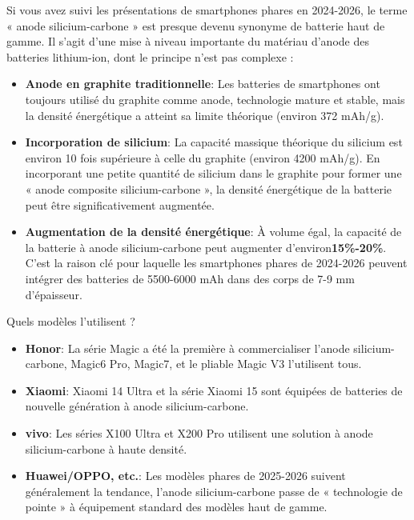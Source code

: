 
Si vous avez suivi les présentations de smartphones phares en 2024-2026, le terme « anode silicium-carbone » est presque devenu synonyme de batterie haut de gamme. Il s'agit d'une mise à niveau importante du matériau d'anode des batteries lithium-ion, dont le principe n'est pas complexe :

\begin{itemize}
  \item \textbf{Anode en graphite traditionnelle}: Les batteries de smartphones ont toujours utilisé du graphite comme anode, technologie mature et stable, mais la densité énergétique a atteint sa limite théorique (environ 372 mAh/g).
  \item \textbf{Incorporation de silicium}: La capacité massique théorique du silicium est environ 10 fois supérieure à celle du graphite (environ 4200 mAh/g). En incorporant une petite quantité de silicium dans le graphite pour former une « anode composite silicium-carbone », la densité énergétique de la batterie peut être significativement augmentée.
  \item \textbf{Augmentation de la densité énergétique}: À volume égal, la capacité de la batterie à anode silicium-carbone peut augmenter d'environ\textbf{15\%-20\%}. C'est la raison clé pour laquelle les smartphones phares de 2024-2026 peuvent intégrer des batteries de 5500-6000 mAh dans des corps de 7-9 mm d'épaisseur.
\end{itemize}

\begin{tcbinfo}{Quels modèles l'utilisent ?}
\begin{itemize}
  \item \textbf{Honor}: La série Magic a été la première à commercialiser l'anode silicium-carbone, Magic6 Pro, Magic7, et le pliable Magic V3 l'utilisent tous.
  \item \textbf{Xiaomi}: Xiaomi 14 Ultra et la série Xiaomi 15 sont équipées de batteries de nouvelle génération à anode silicium-carbone.
  \item \textbf{vivo}: Les séries X100 Ultra et X200 Pro utilisent une solution à anode silicium-carbone à haute densité.
  \item \textbf{Huawei/OPPO, etc.}: Les modèles phares de 2025-2026 suivent généralement la tendance, l'anode silicium-carbone passe de « technologie de pointe » à équipement standard des modèles haut de gamme.
\end{itemize}

\end{tcbinfo}

